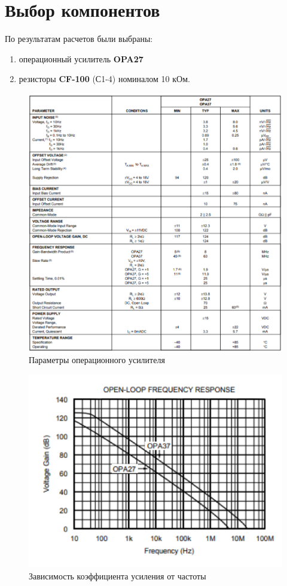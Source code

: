 \chapter{Выбор компонентов}

По результатам расчетов были выбраны:
\begin{enumerate}
\item	операционный усилитель \textbf{OPA27}
\item	резисторы \textbf{ CF-100} (С1-4) номиналом 10 кОм.
\end{enumerate}

\begin{figure}[h!]
	\centering
	\caption{Параметры операционного усилителя }
	\includegraphics{images/1.png}
\end{figure}

\begin{figure}[h!]
	\centering
	\label{fig2}
	\caption{Зависимость коэффициента усиления от частоты}
	\includegraphics{images/2.png}
\end{figure}

